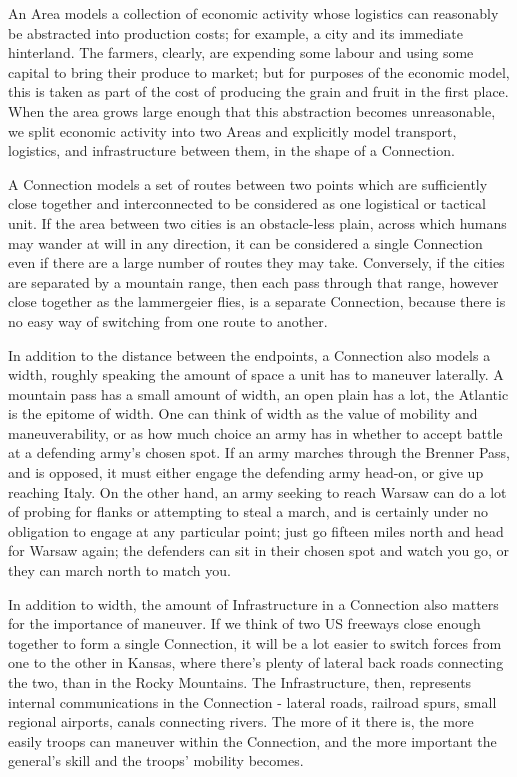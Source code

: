\documentclass[12pt]{book}
\begin{document}
An Area models a collection of economic activity whose logistics can
reasonably be abstracted into production costs; for example, a city
and its immediate hinterland. The farmers, clearly, are expending some
labour and using some capital to bring their produce to market; but
for purposes of the economic model, this is taken as part of the cost
of producing the grain and fruit in the first place. When the area
grows large enough that this
abstraction becomes unreasonable, we split economic activity into two
Areas and explicitly model transport, logistics, and infrastructure
between them, in the shape of a Connection.

A Connection models a set of routes between two points which are
sufficiently close together and interconnected to be considered as one
logistical or tactical unit. If the area between two cities is an
obstacle-less plain, across which humans may wander at will in any
direction, it can be considered a single Connection even if there are
a large number of routes they may take. Conversely, if the cities are
separated by a mountain range, then each pass through that range,
however close together as the lammergeier flies, is a
separate Connection, because there is no easy way of switching from
one route to another.

In addition to the distance between the endpoints, a Connection also
models a width, roughly speaking the amount of space a unit has to
maneuver laterally. A mountain pass has a small amount of width, an
open plain has a lot, the Atlantic is the epitome of width. One can
think of width as the value of mobility and maneuverability, or as how
much choice an army has in whether to accept battle at a defending
army's chosen spot. If an army marches through the Brenner Pass, and is
opposed, it must either engage the defending army head-on, or give up
reaching Italy. On the other hand, an army seeking to reach Warsaw can
do a lot of probing for flanks or attempting to steal a march, and is
certainly under no obligation to engage at any particular point; just
go fifteen miles north and head for Warsaw again; the defenders can
sit in their chosen spot and watch you go, or they can march north to
match you.

In addition to width, the amount of Infrastructure in a Connection
also matters for the importance of maneuver. If we think of two US
freeways close enough together to form a single Connection, it will be
a lot easier to switch forces from one to the other in Kansas, where
there's plenty of lateral back roads connecting the two, than in the
Rocky Mountains. The Infrastructure, then, represents internal
communications in the Connection - lateral roads, railroad spurs,
small regional airports, canals connecting rivers. The more of it
there is, the more easily troops can maneuver within the Connection,
and the more important the general's skill and the troops' mobility
becomes.
\end{document}
